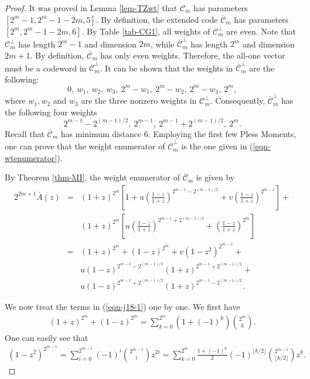 \documentclass[1p,final]{elsarticle}
\newcommand{\C}{{\mathcal{C}}}
\begin{document}
\begin{proof} 
It was proved in Lemma \ref{lem-TZwt} that $\C_m$ has parameters $[2^m-1, 2^m-1-2m, 5]$. 
By definition, the extended code $\overline{\C}_m$ has parameters $[2^m, 2^m-1-2m, 6]$. 
By Table \ref{tab-CG1},  all weights of $\C_m^\perp$ are even. Note that $\C_m^\perp$ 
has length $2^m-1$ and dimension $2m$, while $\overline{\C}_m^\perp$ has length $2^m$ and dimension 
$2m+1$. By definition, $\overline{\C}_m$ has only even weights. Therefore, the all-one vector must 
be a codeword in $\overline{\C}_m^\perp$. It can be shown that the  weights in  $\overline{\C}_m^\perp$ 
are the following: 
$$ 
0, \ w_1,\  w_2, \ w_3,\  2^m-w_1,\  2^m-w_2, \  2^m-w_3, \ 2^m, 
$$
where $w_1, w_2$ and $w_3$ are the three nonzero weights in $\C_m^\perp$. 
Consequently,  $\overline{\C}_m^\perp$ has the following four weights 
$$ 
2^{m-1}-2^{(m-1)/2}, \ 2^{m-1}, \ 2^{m-1}+2^{(m-1)/2}, \ 2^m.  
$$ 
Recall that $\overline{\C}_m$ has minimum distance $6$. Employing 
the first few Pless Moments, one can prove that the weight enumerator of $\overline{\C}_m^\perp$ 
is the one given in (\ref{eqn-wtenumerator}).  

By Theorem \ref{thm-MI}, the weight enumerator of $\overline{\C}_m$ is given by
\begin{eqnarray}\label{eqn-j18-1}
2^{2m+1}\overline{A}(z) &=&  (1+z)^{2^m}\left[ 1 +
             u\left(\frac {1-z} {1+z}\right)^{2^{m-1}-2^{(m-1)/2}}+
             v\left(\frac {1-z} {1+z}\right)^{2^{m-1}} \right] +  \nonumber \\
      &&  (1+z)^{2^m}\left[ u\left(\frac {1-z} {1+z}\right)^{2^{m-1}+2^{(m-1)/2}} + 
      \left(\frac{1-z}{1+z}\right)^{2^m} \right] \nonumber \\
&=&  (1+z)^{2^m} + (1-z)^{2^m} + v (1-z^2)^{2^{m-1}} + \nonumber \\ 
 & &             u(1-z)^{2^{m-1}-2^{(m-1)/2}}(1+z)^{2^{m-1}+2^{(m-1)/2}} + \nonumber \\ 
             & &  
             u(1-z)^{2^{m-1}+2^{(m-1)/2}}(1+z)^{2^{m-1}-2^{(m-1)/2}} .
\end{eqnarray} 

We now treat the terms in (\ref{eqn-j18-1}) one by one. We first have 
\begin{eqnarray}\label{eqn-j18-2}
(1+z)^{2^m} + (1-z)^{2^m} = \sum_{k=0}^{2^m} \left(1+(-1)^k \right) \binom{2^m}{k}.  
\end{eqnarray} 
One can easily see that 
\begin{eqnarray}\label{eqn-j18-3}
(1-z^2)^{2^{m-1}} = \sum_{i=0}^{2^{m-1}} (-1)^i \binom{2^{m-1}}{i} z^{2i} = 
\sum_{k=0}^{2^{m}} \frac{1+(-1)^k}{2} (-1)^{\lfloor k/2 \rfloor} \binom{2^{m-1}}{\lfloor k/2 \rfloor} z^{k}.  
\end{eqnarray} 


\end{proof}
\end{document}
